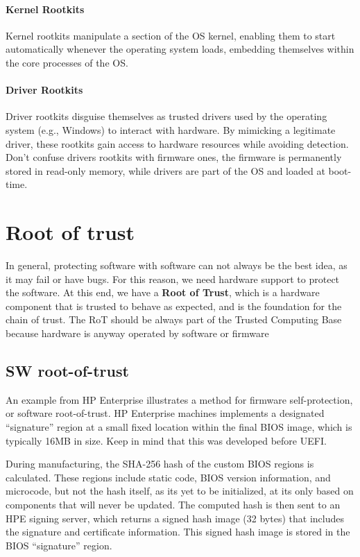 \paragraph{Kernel Rootkits} Kernel rootkits manipulate a section of
the OS kernel, enabling them to start automatically whenever the
operating system loads, embedding themselves within the core processes
of the OS.

\paragraph{Driver Rootkits} Driver rootkits disguise themselves as
trusted drivers used by the operating system (e.g., Windows) to
interact with hardware. By mimicking a legitimate driver, these
rootkits gain access to hardware resources while avoiding detection.
Don't confuse drivers rootkits with firmware ones, the firmware is
permanently stored in read-only memory, while drivers are part of the
OS and loaded at boot-time.

\section{Root of trust}
In general, protecting software with software can not always be the
best idea, as it may fail or have bugs. For this reason, we need
hardware support to protect the software.
At this end, we have a \textbf{Root of Trust}, which is a hardware 
component that is trusted to behave as expected, and is the foundation
for the chain of trust. The RoT should be always part of the Trusted
Computing Base because hardware is anyway operated by software or
firmware
\subsection{SW root-of-trust}

An example from HP Enterprise illustrates a method for firmware
self-protection, or software root-of-trust. HP Enterprise machines
implements a designated “signature” region at a small fixed location
within the final BIOS image, which is typically 16MB in size. Keep in
mind that this was developed before UEFI.

During manufacturing, the SHA-256 hash of the custom BIOS regions is
calculated. These regions include static code, BIOS version
information, and microcode, but not the hash itself, as its yet to be
initialized, at its only based on components that will never be
updated. The computed hash is then sent to an HPE signing server,
which returns a signed hash image (32 bytes) that includes the
signature and certificate information. This signed hash image is
stored in the BIOS “signature” region.


